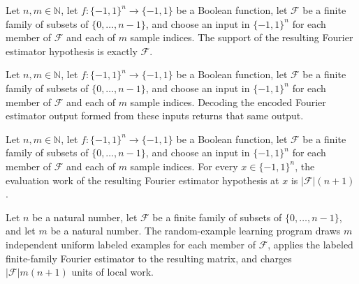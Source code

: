 \begin{theorem}
\label{FABL.finiteFamilyFourierEstimatorOutput_support}
\leanok
{}
Let $n,m\in\mathbb{N}$, let $f:\{-1,1\}^n\to\{-1,1\}$ be a Boolean function, let
$\mathcal{F}$ be a finite family of subsets of $\{0,\ldots,n-1\}$, and choose an input
in $\{-1,1\}^n$ for each member of $\mathcal{F}$ and each of $m$ sample indices. The
support of the resulting Fourier estimator hypothesis is exactly $\mathcal{F}$.
\end{theorem}

\begin{theorem}
\label{FABL.finiteFamilyFourierEstimatorOutput_decode_encode}
\leanok
{}
Let $n,m\in\mathbb{N}$, let $f:\{-1,1\}^n\to\{-1,1\}$ be a Boolean function, let
$\mathcal{F}$ be a finite family of subsets of $\{0,\ldots,n-1\}$, and choose an input
in $\{-1,1\}^n$ for each member of $\mathcal{F}$ and each of $m$ sample indices.
Decoding the encoded Fourier estimator output formed from these inputs returns that same
output.
\end{theorem}

\begin{theorem}
\label{FABL.finiteFamilyFourierEstimatorOutput_evaluationWork}
\leanok
{}
Let $n,m\in\mathbb{N}$, let $f:\{-1,1\}^n\to\{-1,1\}$ be a Boolean function, let
$\mathcal{F}$ be a finite family of subsets of $\{0,\ldots,n-1\}$, and choose an input
in $\{-1,1\}^n$ for each member of $\mathcal{F}$ and each of $m$ sample indices. For
every $x\in\{-1,1\}^n$, the evaluation work of the resulting Fourier estimator
hypothesis at $x$ is $|\mathcal{F}|(n+1)$.
\end{theorem}

\begin{definition}
\label{FABL.finiteFamilyFourierEstimatorProgramWithSamples}
\leanok
{}
Let $n$ be a natural number, let $\mathcal F$ be a finite family of subsets of
$\{0,\ldots,n-1\}$, and let $m$ be a natural number. The random-example learning program
draws $m$ independent uniform labeled examples for each member of $\mathcal F$, applies
the labeled finite-family Fourier estimator to the resulting matrix, and charges
$|\mathcal F|m(n+1)$ units of local work.
\end{definition}

